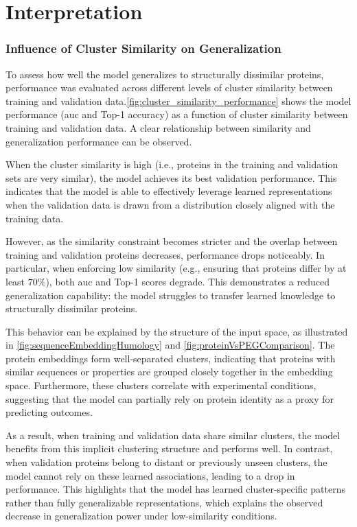 \section{Interpretation}\label{sec:results/interpretation}

\subsubsection*{Influence of Cluster Similarity on Generalization}
To assess how well the model generalizes to structurally dissimilar proteins, performance was evaluated across different levels of cluster similarity between training and validation data.\autoref{fig:cluster_similarity_performance} shows the model performance (\gls{auc} and Top-1 accuracy) as a function of cluster similarity between training and validation data. A clear relationship between similarity and generalization performance can be observed.

When the cluster similarity is high (i.e., proteins in the training and validation sets are very similar), the model achieves its best validation performance. This indicates that the model is able to effectively leverage learned representations when the validation data is drawn from a distribution closely aligned with the training data.

However, as the similarity constraint becomes stricter and the overlap between training and validation proteins decreases, performance drops noticeably. In particular, when enforcing low similarity (e.g., ensuring that proteins differ by at least $70\%$), both \gls{auc} and Top-1 scores degrade. This demonstrates a reduced generalization capability: the model struggles to transfer learned knowledge to structurally dissimilar proteins.

This behavior can be explained by the structure of the input space, as illustrated in \autoref{fig:sequenceEmbeddingHumology} and \autoref{fig:proteinVsPEGComparison}. The protein embeddings form well-separated clusters, indicating that proteins with similar sequences or properties are grouped closely together in the embedding space. Furthermore, these clusters correlate with experimental conditions, suggesting that the model can partially rely on protein identity as a proxy for predicting outcomes.

As a result, when training and validation data share similar clusters, the model benefits from this implicit clustering structure and performs well. In contrast, when validation proteins belong to distant or previously unseen clusters, the model cannot rely on these learned associations, leading to a drop in performance. This highlights that the model has learned cluster-specific patterns rather than fully generalizable representations, which explains the observed decrease in generalization power under low-similarity conditions.

